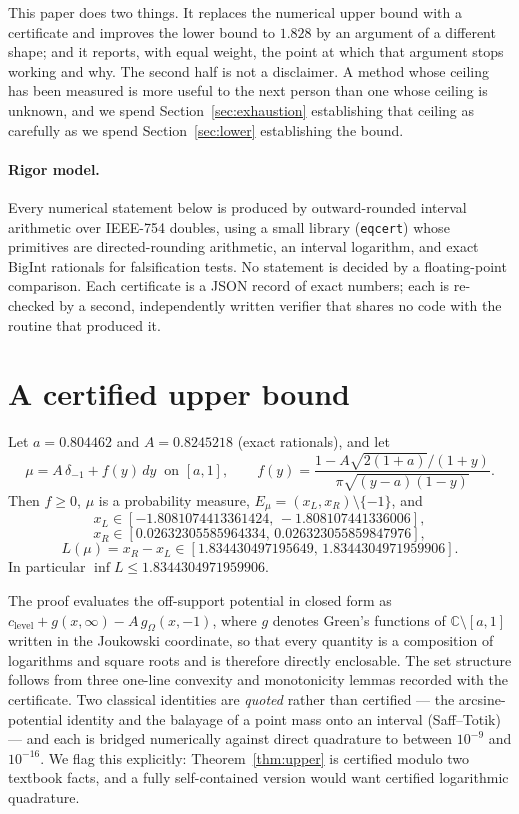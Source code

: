 \documentclass[11pt]{article}
\begin{document}
This paper does two things. It replaces the numerical upper bound with a
certificate and improves the lower bound to $1.828$ by an argument of a
different shape; and it reports, with equal weight, the point at which
that argument stops working and why. The second half is not a
disclaimer. A method whose ceiling has been measured is more useful to
the next person than one whose ceiling is unknown, and we spend
Section~\ref{sec:exhaustion} establishing that ceiling as carefully as we
spend Section~\ref{sec:lower} establishing the bound.

\paragraph{Rigor model.} Every numerical statement below is produced by
outward-rounded interval arithmetic over IEEE-754 doubles, using a small
library (\texttt{eqcert}) whose primitives are directed-rounding
arithmetic, an interval logarithm, and exact BigInt rationals for
falsification tests. No statement is decided by a floating-point
comparison. Each certificate is a JSON record of exact numbers; each is
re-checked by a second, independently written verifier that shares no
code with the routine that produced it.

\section{A certified upper bound}\label{sec:upper}

\begin{theorem}\label{thm:upper}
Let $a=0.804462$ and $A=0.8245218$ (exact rationals), and let
\[
  \mu = A\,\delta_{-1} + f(y)\,dy \ \text{ on } [a,1],
  \qquad
  f(y)=\frac{1-A\sqrt{2(1+a)}/(1+y)}{\pi\sqrt{(y-a)(1-y)}} .
\]
Then $f\ge 0$, $\mu$ is a probability measure, $E_\mu=(x_L,x_R)
\setminus\{-1\}$, and
\[
  x_L\in[-1.8081074413361424,\,-1.808107441336006],
\]
\[
  x_R\in[0.02632305585964334,\,0.026323055859847976],
\]
\[
  L(\mu)=x_R-x_L\in[1.834430497195649,\,1.8344304971959906].
\]
In particular $\inf L\le 1.8344304971959906$.
\end{theorem}

The proof evaluates the off-support potential in closed form as
$c_{\mathrm{level}}+g(x,\infty)-A\,g_\Omega(x,-1)$, where $g$ denotes
Green's functions of $\mathbb{C}\setminus[a,1]$ written in the Joukowski
coordinate, so that every quantity is a composition of logarithms and
square roots and is therefore directly enclosable. The set structure
follows from three one-line convexity and monotonicity lemmas recorded
with the certificate. Two classical identities are \emph{quoted} rather
than certified --- the arcsine-potential identity and the balayage of a
point mass onto an interval (Saff--Totik) --- and each is bridged
numerically against direct quadrature to between $10^{-9}$ and
$10^{-16}$. We flag this explicitly: Theorem~\ref{thm:upper} is
certified modulo two textbook facts, and a fully self-contained version
would want certified logarithmic quadrature.
\end{document}
